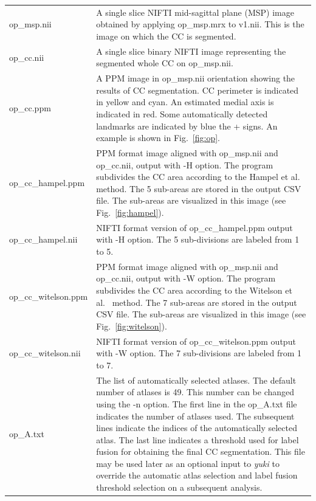 \documentclass[11pt]{article}
\begin{document}
\begin{longtable}{p{}p{}}
op\_msp.nii &  A single slice NIFTI mid-sagittal plane (MSP) image obtained by 
applying op\_msp.mrx to v1.nii. This is the image on which the CC is segmented.  \\

op\_cc.nii &  A single slice binary NIFTI image representing the segmented whole CC
on op\_msp.nii. \\

op\_cc.ppm &  A PPM image in op\_msp.nii orientation showing the results of CC
segmentation.  CC perimeter is indicated in yellow and cyan.  An estimated medial axis
is indicated in red.  Some automatically detected landmarks are indicated by blue the
+ signs. An example is shown in Fig.\ \ref{fig:op}.
\\

op\_cc\_hampel.ppm & PPM format image aligned with op\_msp.nii and op\_cc.nii,
output with -H option. The program subdivides the CC area 
according to the Hampel et al.\ \citep{Hampel1998-fz} method. 
The 5 sub-areas are stored
in the output CSV file. The sub-areas are visualized in this image 
(see Fig.\ \ref{fig:hampel}). \\ 

op\_cc\_hampel.nii & NIFTI format version of op\_cc\_hampel.ppm output with -H option. 
The 5 sub-divisions are labeled from 1 to 5. \\

op\_cc\_witelson.ppm & PPM format image aligned with op\_msp.nii and op\_cc.nii,
output with -W option. The program subdivides the CC area 
according to the Witelson et al.\ \citep{Narayan2016-es} method. 
The 7 sub-areas are stored
in the output CSV file. The sub-areas are visualized in this image 
(see Fig.\ \ref{fig:witelson}). \\ 

op\_cc\_witelson.nii & NIFTI format version of op\_cc\_witelson.ppm output with -W option. 
The 7 sub-divisions are labeled from 1 to 7. \\

op\_A.txt &  The list of automatically selected atlases.  
The default number of atlases is 49.  This number
can be changed using the -n option.  The first line in the op\_A.txt file indicates the
number of atlases used.  The subsequent lines indicate the indices of the automatically selected
atlas.  The last line indicates a threshold used for label fusion for obtaining the final 
CC segmentation.  This file may be used later as an optional input to {\it yuki} 
to override the automatic atlas selection and label fusion threshold selection on a subsequent
analysis.
\\


\end{longtable}
\end{document}
